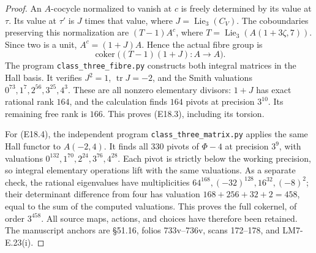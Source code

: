 \documentclass[11pt,oneside]{article}
\DeclareMathOperator{\coker}{coker}
\DeclareMathOperator{\tr}{tr}
\begin{document}
\begin{proof}
An $A$-cocycle normalized to vanish at $c$ is
freely determined by its value at $\tau$.
Its value at $\tau'$ is $J$ times that value,
where $J=\operatorname{Lie}_3(C_V)$.
The coboundaries preserving this normalization
are $(T-1)A^c$, where
$T=\operatorname{Lie}_3(A(1+3\zeta,7))$.
Since two is a unit, $A^c=(1+J)A$. Hence the
actual fibre group is
\[
 \coker\bigl((T-1)(1+J):A\to A\bigr).
 \tag{E18.10}
\]
The program \texttt{class\_three\_fibre.py}
constructs both integral matrices in the Hall
basis. It verifies $J^2=1$, $\tr J=-2$, and
the Smith valuations
$0^{73},1^7,2^{56},3^{25},4^3$.
These are all nonzero elementary divisors:
$1+J$ has exact rational rank $164$, and the
calculation finds $164$ pivots at precision
$3^{10}$. Its remaining free rank is $166$.
This proves (E18.3), including its torsion.

For (E18.4), the independent program
\texttt{class\_three\_matrix.py} applies the
same Hall functor to $A(-2,4)$. It finds all
$330$ pivots of $\Phi-4$ at precision $3^9$,
with valuations
$0^{132},1^{70},2^{24},3^{76},4^{28}$.
Each pivot is strictly below the working
precision, so integral elementary operations
lift with the same valuations. As a separate
check, the rational eigenvalues have
multiplicities
$64^{168},(-32)^{128},16^{32},(-8)^2$;
their determinant difference from four has
valuation $168+256+32+2=458$, equal to the
sum of the computed valuations. This proves
the full cokernel, of order $3^{458}$.
All source maps, actions, and choices have
therefore been retained. The manuscript
anchors are \S51.16, folios 733v--736v,
scans 172--178, and LM7-E.23(i).
\end{proof}
\end{document}
